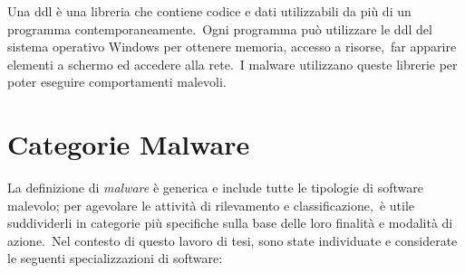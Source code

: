 Una ddl è una libreria che contiene codice e dati utilizzabili da più di un programma contemporaneamente.\
Ogni programma può utilizzare le ddl del sistema operativo Windows per ottenere memoria, accesso a risorse,\
far apparire elementi a schermo ed accedere alla rete.\
I malware utilizzano queste librerie per poter eseguire comportamenti malevoli.

\section{Categorie Malware}

La definizione di \textit{malware} è generica e include tutte le tipologie di software malevolo; per agevolare le attività di rilevamento e classificazione,\
è utile suddividerli in categorie più specifiche sulla base delle loro finalità e modalità di azione.\
Nel contesto di questo lavoro di tesi, sono state individuate e considerate le seguenti specializzazioni di software:

